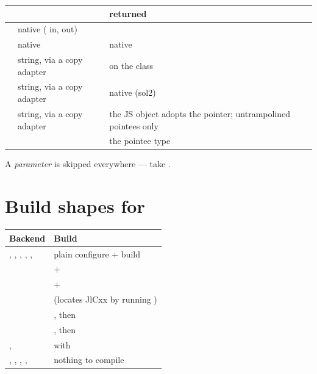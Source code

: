 \begin{center}
\small
\begin{tabular}{@{}lL{4.4cm}L{4.6cm}@{}}
\toprule
\textbf{} & \textbf{} &
  \textbf{ returned} \\
\midrule
{} & native ( in,  out) &
   \\
 & native & native \\
 & string, via a copy adapter &  on the
  class \\
 & string, via a copy adapter & native (sol2) \\
 & string, via a copy adapter & the JS object adopts the pointer;
  untrampolined pointees only \\
 &  & the pointee type \\
\bottomrule
\end{tabular}
\end{center}

A  \emph{parameter} is skipped everywhere --- take
.

\section{Build shapes for }

\begin{center}
\small
\begin{tabular}{@{}L{6.0cm}L{7.0cm}@{}}
\toprule
\textbf{Backend} & \textbf{Build} \\
\midrule
{}, , , , ,
   & plain  configure + build \\
 &  +  \\
 &  +  \\
 &  (locates JlCxx by running ) \\
 & , then  \\
 & , then  \\
,  &  with  \\
, , , ,
   & nothing to compile \\
\bottomrule
\end{tabular}
\end{center}

